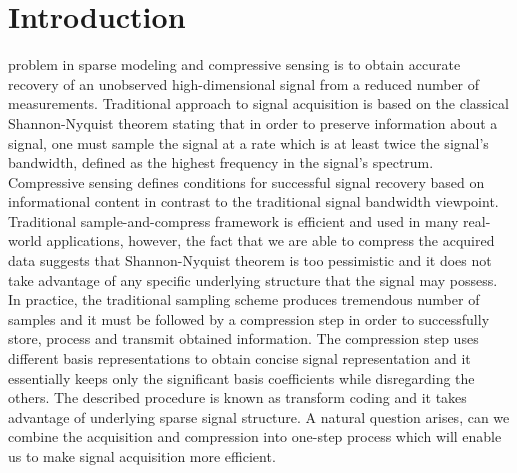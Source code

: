 \documentclass[journal]{IEEEtran}
\begin{document}
\section{Introduction}
% 
% 
% 
% 
 problem in sparse modeling and compressive sensing is to obtain accurate recovery of an unobserved high-dimensional signal from a reduced number of measurements. Traditional approach to signal acquisition is based on the classical Shannon-Nyquist theorem \cite{shannon1949, nyquist1928certain} stating that in order to preserve information about a signal, one must sample the signal at a rate which is at least twice the signal's bandwidth, defined as the highest frequency in the signal's spectrum.  Compressive sensing defines conditions for successful signal recovery based on informational content in contrast to the traditional signal bandwidth viewpoint. Traditional sample-and-compress framework is efficient and used in many real-world applications, however, the fact that we are able to compress the acquired data suggests that Shannon-Nyquist theorem is too pessimistic and it does not take advantage of any specific underlying structure that the signal may possess. In practice, the traditional sampling scheme produces tremendous number of samples and it must be followed by a compression step in order to successfully store, process and transmit obtained information. The compression step uses different basis representations to obtain concise signal representation and it essentially keeps only the significant basis coefficients while disregarding the others. The described procedure is known as transform coding and it takes advantage of underlying sparse signal structure. A natural question arises, can we combine the acquisition and compression into one-step process which will enable us to make signal acquisition more efficient.
\end{document}
